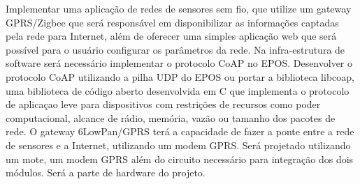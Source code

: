 Implementar uma aplica\c{c}\~ao de redes de sensores sem fio, que utilize um gateway GPRS/Zigbee que ser\'a respons\'avel em disponibilizar as informa\c{c}\~oes captadas pela rede para Internet, al\'em de oferecer uma simples aplica\c{c}\~ao web que ser\'a poss\'ivel para o usu\'ario configurar os par\^ametros da rede.
Na infra-estrutura de software ser\'a necess\'ario implementar o protocolo CoAP no EPOS. Desenvolver o protocolo CoAP utilizando a pilha UDP do EPOS ou portar a biblioteca libcoap, uma biblioteca de c\'odigo aberto desenvolvida em C que implementa o protocolo de aplica\c{c}ao leve para dispositivos com restri\c{c}\~oes de recursos como poder computacional, alcance de r\'adio, mem\'oria, vaz\~ao ou tamanho dos pacotes de rede.
O gateway 6LowPan/GPRS ter\'a a capacidade de fazer a ponte entre a rede de sensores e a Internet, utilizando um modem GPRS. Ser\'a projetado utilizando um mote, um modem GPRS al\'em do circuito necess\'ario para integra\c{c}\~ao dos dois m\'odulos. Ser\'a a parte de hardware do projeto.
